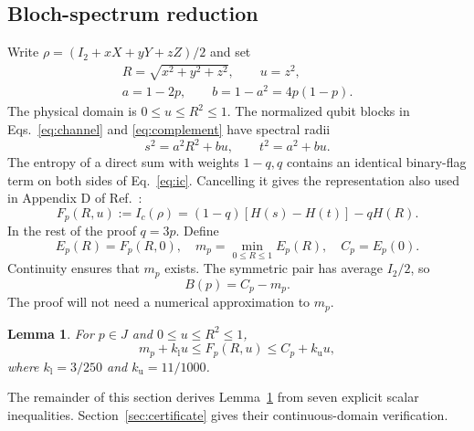 \documentclass[aps,pra,reprint,amsmath,amssymb,longbibliography,nofootinbib]{revtex4-2}
\newtheorem{lemma}{Lemma}
\newcommand{\kl}{k_{\mathrm l}}
\newcommand{\ku}{k_{\mathrm u}}
\begin{document}
\subsection{Bloch-spectrum reduction}
Write $\rho=(I_2+xX+yY+zZ)/2$ and set
\begin{equation}
 \begin{gathered}
 R=\sqrt{x^2+y^2+z^2},\qquad u=z^2,\\
 a=1-2p,\qquad b=1-a^2=4p(1-p).
 \end{gathered}
 \label{eq:variables}
\end{equation}
The physical domain is $0\le u\le R^2\le1$. The normalized qubit blocks in Eqs.~\eqref{eq:channel} and \eqref{eq:complement} have spectral radii
\begin{equation}
 s^2=a^2R^2+bu,\qquad t^2=a^2+bu.
 \label{eq:spectra}
\end{equation}
The entropy of a direct sum with weights $1-q,q$ contains an identical binary-flag term on both sides of Eq.~\eqref{eq:ic}. Cancelling it gives the representation also used in Appendix D of Ref.~\cite{LLS2018}:
\begin{equation}
 F_p(R,u):=I_c(\rho)=(1-q)[H(s)-H(t)]-qH(R).
 \label{eq:F}
\end{equation}
In the rest of the proof $q=3p$. Define
\begin{equation}
 E_p(R)=F_p(R,0),\quad
 m_p=\min_{0\le R\le1}E_p(R),\quad C_p=E_p(0).
 \label{eq:EmC}
\end{equation}
Continuity ensures that $m_p$ exists. The symmetric pair has average $I_2/2$, so
\begin{equation}
 B(p)=C_p-m_p.
 \label{eq:match}
\end{equation}
The proof will not need a numerical approximation to $m_p$.

\begin{lemma}\label{lem:envelopes}
For $p\in J$ and $0\le u\le R^2\le1$,
\begin{equation}
 m_p+\kl u\le F_p(R,u)\le C_p+\ku u,
 \label{eq:envelopes}
\end{equation}
where $\kl=3/250$ and $\ku=11/1000$.
\end{lemma}

The remainder of this section derives Lemma~\ref{lem:envelopes} from seven explicit scalar inequalities. Section~\ref{sec:certificate} gives their continuous-domain verification.
\end{document}
